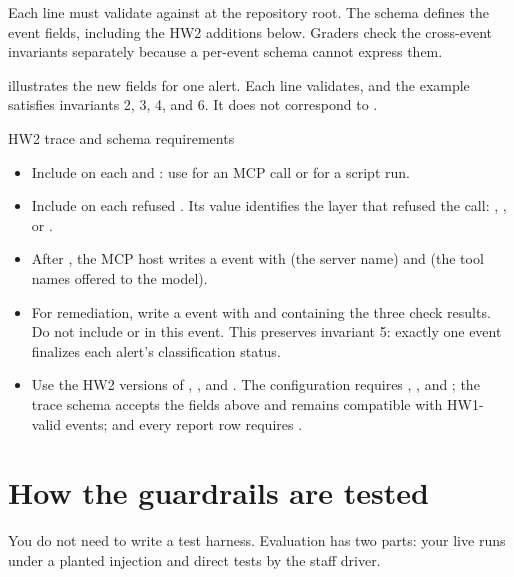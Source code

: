 \documentclass[9pt,letterpaper]{article}
\begin{document}
Each line must validate against  at the repository root.
The schema defines the event fields, including the HW2 additions below. Graders
check the cross-event invariants separately because a per-event schema cannot
express them.

 illustrates the new fields for one alert.
Each line validates, and the example satisfies invariants 2, 3, 4, and 6. It does
not correspond to .

\begin{required}{HW2 trace and schema requirements}
\begin{itemize}
\item Include  on each  and :
  use  for an MCP call or  for a script run.
\item Include  on each refused . Its value
  identifies the layer that refused the call: , ,
  or .
\item After , the MCP host writes a  event with
   (the server name) and  (the tool names offered to
  the model).
\item For remediation, write a  event with
   and  containing the three check results.
  Do not include  or  in this event. This preserves
  invariant 5: exactly one event finalizes each alert's classification status.
\item Use the HW2 versions of ,
  , and . The configuration
  requires , , and ; the trace schema accepts
  the fields above and remains compatible with HW1-valid events; and every report
  row requires .
\end{itemize}
\end{required}

\section{How the guardrails are tested}\label{sec:tested}

You do not need to write a test harness. Evaluation has two parts: your live runs
under a planted injection and direct tests by the staff driver.
\end{document}
